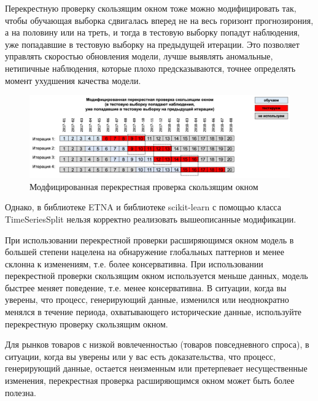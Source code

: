 \documentclass[%
	11pt,
	a4paper,
	utf8,
		]{article}
\begin{document}
Перекрестную проверку скользящим окном тоже можно модифицировать так, чтобы обучающая выборка сдвигалась вперед не на весь горизонт прогнозирония, а на половину или на треть, и тогда в тестовую выборку попадут наблюдения, уже попадавшие в тестовую выборку на предыдущей итерации. Это позволяет управлять скоростью обновления модели, лучше выявлять аномальные, нетипичные наблюдения, которые плохо предсказываются, точнее определять момент ухудшения качества модели.

\begin{figure}[h]
	\centering
	\includegraphics[scale=0.3]{figures/cross_val_rol_modif_ts.png}
	\caption{ Модфицированная перекрестная проверка скользящим окном }\label{fig:cross_val_rol_modif_ts}
\end{figure}

Однако, в библиотеке ETNA и библиотеке scikit-learn с помощью класса TimeSeriesSplit нельзя корректно реализовать вышеописанные модификации.

При использовании перекрестной проверки расширяющимся окном модель в большей степени нацелена на обнаружение глобальных паттернов и менее склонна к изменениям, т.е. более консервативна. При использовании перекрестной проверки скользящим окном используется меньше данных, модель быстрее меняет поведение, т.е. менее консервативна. В ситуации, когда вы уверены, что процесс, генерирующий данные, изменился или неоднократно менялся в течение периода, охватывающего исторические данные, используйте перекрестную проверку скользящим окном.

Для рынков товаров с низкой вовлеченностью (товаров повседневного спроса), в ситуации, когда вы уверены или у вас есть доказательства, что процесс, генерирующий данные, остается неизменным или претерпевает несущественные изменения, перекрестная проверка расширяющимся окном может быть более полезна.

\end{document}
